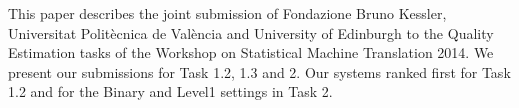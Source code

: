 This paper describes the joint submission of Fondazione Bruno Kessler, Universitat Politècnica de València and University of Edinburgh to the Quality Estimation tasks of the Workshop on Statistical Machine Translation 2014. We present our submissions for Task 1.2, 1.3 and 2. Our systems ranked first for Task 1.2 and for the Binary and Level1 settings in Task 2.
